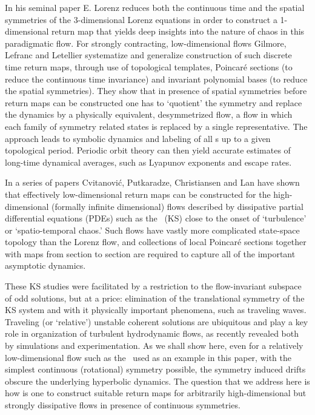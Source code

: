 %
In his seminal paper E. Lorenz reduces both the
continuous time and the spatial symmetries of the
3-dimensional Lorenz equations in order to construct a
1-dimensional return map that yields deep
insights into the nature of chaos in this
paradigmatic flow. For strongly contracting, low-dimensional
flows Gilmore, Lefranc and
Letellier systematize and
generalize construction of such discrete time return maps,
through use of topological templates, Poincar\'e sections (to
reduce the continuous time invariance) and invariant
polynomial bases (to reduce the spatial symmetries). They
show that in presence of spatial symmetries before return
maps can be constructed one has to  `quotient' the symmetry
and replace the dynamics by a physically equivalent,
desymmetrized flow, a flow in which each family of symmetry
related states is replaced by a single representative. The
approach leads to symbolic dynamics and labeling of all \po
s up to a given topological period. Periodic orbit theory
can then yield accurate estimates of long-time dynamical
averages, such as Lyapunov exponents and escape
rates.

In a series of papers Cvitanovi\'{c}, Putkaradze,
Christiansen and Lan%
have shown that effectively low-dimensional return maps can
be constructed for the high-dimensional (formally infinite
dimensional)  flows described by dissipative partial differential
equations (PDEs) such as the \KSe\ (KS) close to the onset of
`turbulence' or `spatio-temporal chaos.' Such flows have
vastly more complicated state-space topology than the Lorenz
flow, and collections of local Poincar\'e sections together
with maps from section to section are required to capture all
of the important asymptotic dynamics.

These KS studies were facilitated by a restriction to the
flow-invariant subspace of odd solutions, but at a price:
elimination of the translational symmetry of the KS system
and with it physically important phenomena, such as traveling
waves. Traveling (or `relative') unstable coherent solutions
are ubiquitous and play a key role in organization of
turbulent hydrodynamic flows, as recently revealed both by
simulations and
experimentation. As we
shall show here, even for a relatively low-dimensional flow
such as the \cLe\ used as an example in this paper, with the simplest
continuous (rotational) symmetry possible, the symmetry
induced drifts obscure the underlying hyperbolic dynamics.
The question that we address here is how is one to construct
suitable return maps for arbitrarily high-dimensional but
strongly dissipative flows in presence of continuous
symmetries.

